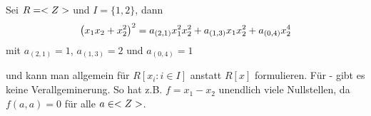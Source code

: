 \begin{example}
	Sei $R = <Z>$ und $I = \{1,2\}$, dann
	\begin{align}
		\left( x_1 x_2 + x_2^2 \right)^2 = a_{(2,1)}x_1^2 x_2^2 + a_{(1,3)}x_1 x_2^2 + a_{(0,4)}x_2^4\notag	
	\end{align}
	mit $a_{(2,1)} = 1$, $a_{(1,3)} = 2$ und $a_{(0,4)} = 1$
\end{example}

\begin{remark}
	 und  kann man allgemein für $R[x_i \colon i \in I]$ anstatt $R[x]$ formulieren. Für  -  gibt es keine Verallgeminerung. So hat z.B. $f = x_1 - x_2$ unendlich viele Nullstellen, da $f(a,a) = 0$ für alle $a \in <Z>$.
\end{remark}